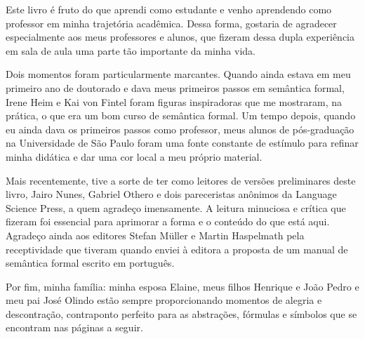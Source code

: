 \begin{refsection}


Este livro é fruto do que aprendi como estudante e venho aprendendo como professor em minha trajetória acadêmica. Dessa forma, gostaria de agradecer especialmente aos meus professores e alunos, que fizeram dessa dupla experiência em sala de aula uma parte tão importante da minha vida. 

Dois momentos foram particularmente marcantes. Quando ainda estava em meu primeiro ano de doutorado e dava meus primeiros passos em semântica formal, Irene Heim e Kai von Fintel foram figuras inspiradoras que me mostraram, na prática, o que era um bom curso de semântica formal. Um tempo depois, quando eu ainda dava os primeiros passos como professor, meus alunos de pós-graduação na Universidade de São Paulo foram uma fonte constante de estímulo para refinar minha didática e dar uma cor local a meu próprio material.

Mais recentemente, tive a sorte de ter como leitores de versões preliminares deste livro, Jairo Nunes, Gabriel Othero e dois pareceristas anônimos da Language Science Press, a quem agradeço imensamente. A leitura minuciosa e crítica que fizeram foi essencial para aprimorar a forma e o conteúdo do que está aqui. Agradeço ainda aos editores Stefan M\"{u}ller e Martin Haspelmath pela receptividade que tiveram quando enviei à editora a proposta de um manual de semântica formal escrito em português.

Por fim, minha família: minha esposa Elaine, meus filhos Henrique e João Pedro e meu pai José Olindo estão sempre proporcionando momentos de alegria e descontração, contraponto perfeito para as abstrações, fórmulas e símbolos que se encontram nas páginas a seguir.   



\end{refsection}

